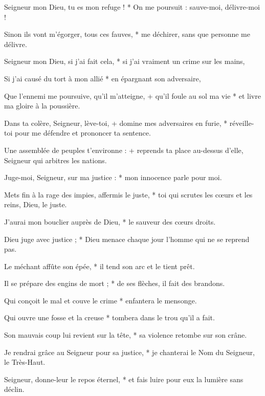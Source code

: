 \item Seigneur mon Dieu, tu es mon refuge ! * On me poursuit : sauve-moi, délivre-moi !

\item Sinon ils vont m'égorger, tous ces fauves, * me déchirer, sans que personne me délivre.

\item Seigneur mon Dieu, si j'ai fait cela, * si j'ai vraiment un crime sur les mains,

\item Si j'ai causé du tort à mon allié * en épargnant son adversaire,

\item Que l'ennemi me poursuive, qu'il m'atteigne, + qu'il foule au sol ma vie * et livre ma gloire à la poussière.

\item Dans ta colère, Seigneur, lève-toi, + domine mes adversaires en furie, * réveille-toi pour me défendre et prononcer ta sentence.

\item Une assemblée de peuples t'environne : + reprends ta place au-dessus d'elle, Seigneur qui arbitres les nations.

\item Juge-moi, Seigneur, sur ma justice : * mon innocence parle pour moi.

\item Mets fin à la rage des impies, affermis le juste, * toi qui scrutes les cœurs et les reins, Dieu, le juste.

\item J'aurai mon bouclier auprès de Dieu, * le sauveur des cœurs droits.

\item Dieu juge avec justice ; * Dieu menace chaque jour l'homme qui ne se reprend pas.

\item Le méchant affûte son épée, * il tend son arc et le tient prêt.

\item Il se prépare des engins de mort ; * de ses flèches, il fait des brandons.

\item Qui conçoit le mal et couve le crime * enfantera le mensonge.

\item Qui ouvre une fosse et la creuse * tombera dans le trou qu'il a fait.

\item Son mauvais coup lui revient sur la tête, * sa violence retombe sur son crâne.

\item Je rendrai grâce au Seigneur pour sa justice, * je chanterai le Nom du Seigneur, le Très-Haut.

\item Seigneur, donne-leur le repos éternel, * et fais luire pour eux la lumière sans déclin.